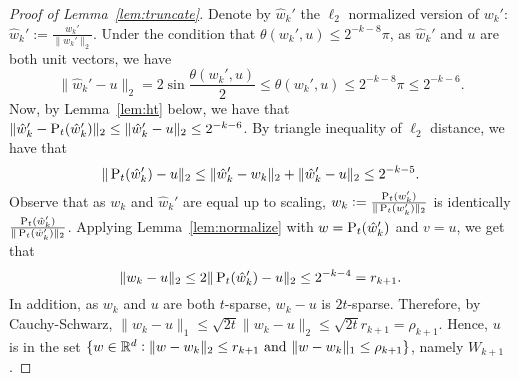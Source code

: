 \begin{proof}[Proof of Lemma~\ref{lem:truncate}]
  Denote by $\hat{w}_k'$ the $\ell_2$ normalized version of $w_k'$: $\hat{w}_k':=\frac{w_k'}{\| w_k' \|_2}$.
  Under the condition that $\theta(w_k', u) \leq 2^{-k-8} \pi$, as $\hat{w}_k'$ and $u$ are both unit vectors, we have
\begin{equation*}
  \| \hat{w}_k' - u \|_2 = 2 \sin \frac{\theta(w_k', u)}{2} \leq \theta(w_k', u) \leq 2^{-k-8} \pi \leq 2^{-k-6}.
\end{equation*}
Now, by Lemma~\ref{lem:ht} below, we have that
$\| \hat{w}_k' - \operatorname{P}_t(\hat{w}_k') \|_2 \leq   \| \hat{w}_k' - u \|_2 \leq 2^{-k-6}$. By triangle inequality of $\ell_2$ distance, we have that
\begin{equation*}
 \| \operatorname{P}_t(\hat{w}_k') - u \|_2 \leq \| \hat{w}_k' - w_k \|_2 + \| \hat{w}_k' - u \|_2 \leq 2^{-k-5}.
\end{equation*}
Observe that as
$w_k$ and $\hat{w}_k'$ are equal up to scaling, $w_k := \frac{\operatorname{P}_t(w_k')}{\| \operatorname{P}_t(w_k') \|_2}$ is identically $\frac{\operatorname{P}_t(\hat{w}_k')}{\| \operatorname{P}_t(\hat{w}_k') \|_2}$.
Applying Lemma~\ref{lem:normalize} with $w = \operatorname{P}_t(\hat{w}_k')$ and $v = u$, we get that
\[ \| w_k - u \|_2 \leq 2 \| \operatorname{P}_t(\hat{w}_k') - u \|_2 \leq 2^{-k-4} = r_{k+1}. \]
In addition, as $w_k$ and $u$ are both $t$-sparse, $w_k - u$ is $2t$-sparse. Therefore, by Cauchy-Schwarz, $ \| w_k - u \|_1 \leq \sqrt{2t} \| w_k - u \|_2 \leq \sqrt{2t} r_{k+1} = \rho_{k+1}$.
Hence, $u$ is in the set $\{ w \in \mathbb{R}^d: \| w - w_k \|_2 \leq r_{k+1} \text{ and } \| w - w_k \|_1 \leq \rho_{k+1} \}$, namely $W_{k+1}$.
\end{proof}




